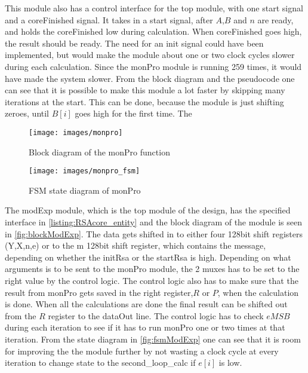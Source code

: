 This module also has a control interface for the top module, with one start signal and a coreFinished signal. It takes in a start signal, after $A$,$B$ and $n$ are ready, and holds the coreFinished low during calculation. When coreFinished goes high, the result should be ready. The need for an init signal could have been implemented, but would make the module about one or two clock cycles slower during each calculation. Since the monPro module is running 259 times, it would have made the system slower. From the block diagram and the pseudocode one can see that it is possible to make this module a lot faster by skipping many iterations at the start. This can be done, because the module is just shifting zeroes, until $B[i]$ goes high for the first time. The

\begin{figure}[htp]
    \centering
    \texttt{[image: images/monpro]}
    \caption{Block diagram of the monPro function}
    \label{fig:blockMonPro}
\end{figure}

\begin{figure}[htp]
    \centering
    \texttt{[image: images/monpro\_fsm]}
    \caption{FSM state diagram of monPro}
    \label{fig:fsmMonPro}
\end{figure}



The modExp module, which is the top module of the design, has the specified interface in \cref{listing:RSAcore_entity} and the block diagram of the module is seen in \cref{fig:blockModExp}. The data gets shifted in to either four 128bit shift registers (Y,X,n,e) or to the m 128bit shift register, which contains the message, depending on whether the initRsa or the startRsa is high. Depending on what arguments is to be sent to the monPro module, the 2 muxes has to be set to the right value by the control logic. The control logic also has to make sure that the result from monPro gets saved in the right register,$R$ or $P$, when the calculation is done. When all the calculations are done the final result can be shifted out from the $R$ register to the dataOut line. The control logic has to check $eMSB$ during each iteration to see if it has to run monPro one or two times at that iteration. From the state diagram in \cref{fig:fsmModExp} one can see that it is room for improving the the module further by not wasting a clock cycle at every iteration to change state to the second\_loop\_calc if $e[i]$ is low.

